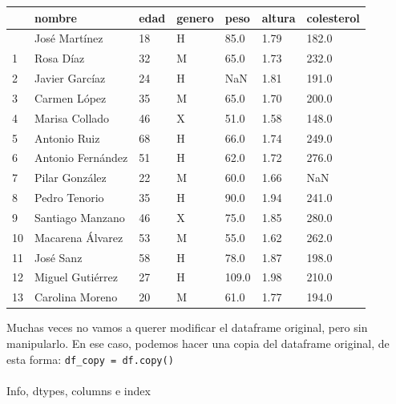 \documentclass[
  letterpaper,
  DIV=11,
  numbers=noendperiod]{scrreprt}
\makeatletter
\let\oldparagraph\paragraph
\renewcommand{\paragraph}{
    \@ifstar
      \xxxParagraphStar
      \xxxParagraphNoStar
  }
\newcommand{\xxxParagraphStar}[1]{\oldparagraph*{#1}\mbox{}}
\newcommand{\xxxParagraphNoStar}[1]{\oldparagraph{#1}\mbox{}}
\makeatother
\begin{document}
\begin{longtable}[]{@{}lllllll@{}}
\toprule\noalign{}
& nombre & edad & genero & peso & altura & colesterol \\
\midrule\noalign{}
\endhead
\bottomrule\noalign{}
\endlastfoot
0 & José Martínez & 18 & H & 85.0 & 1.79 & 182.0 \\
1 & Rosa Díaz & 32 & M & 65.0 & 1.73 & 232.0 \\
2 & Javier Garcíaz & 24 & H & NaN & 1.81 & 191.0 \\
3 & Carmen López & 35 & M & 65.0 & 1.70 & 200.0 \\
4 & Marisa Collado & 46 & X & 51.0 & 1.58 & 148.0 \\
5 & Antonio Ruiz & 68 & H & 66.0 & 1.74 & 249.0 \\
6 & Antonio Fernández & 51 & H & 62.0 & 1.72 & 276.0 \\
7 & Pilar González & 22 & M & 60.0 & 1.66 & NaN \\
8 & Pedro Tenorio & 35 & H & 90.0 & 1.94 & 241.0 \\
9 & Santiago Manzano & 46 & X & 75.0 & 1.85 & 280.0 \\
10 & Macarena Álvarez & 53 & M & 55.0 & 1.62 & 262.0 \\
11 & José Sanz & 58 & H & 78.0 & 1.87 & 198.0 \\
12 & Miguel Gutiérrez & 27 & H & 109.0 & 1.98 & 210.0 \\
13 & Carolina Moreno & 20 & M & 61.0 & 1.77 & 194.0 \\
\end{longtable}

\hfill\break

\begin{tcolorbox}[enhanced jigsaw, arc=.35mm, toptitle=1mm, colframe=quarto-callout-note-color-frame, bottomtitle=1mm, opacitybacktitle=0.6, colbacktitle=quarto-callout-note-color!10!white, leftrule=.75mm, coltitle=black, toprule=.15mm, titlerule=0mm, title=\textcolor{quarto-callout-note-color}{\faInfo}\hspace{0.5em}{Note}, bottomrule=.15mm, rightrule=.15mm, colback=white, breakable, opacityback=0, left=2mm]

Muchas veces no vamos a querer modificar el dataframe original, pero sin
manipularlo. En ese caso, podemos hacer una copia del dataframe
original, de esta forma: \texttt{df\_copy\ =\ df.copy()}

\end{tcolorbox}

\paragraph{Info, dtypes, columns e
index}\label{info-dtypes-columns-e-index}
\end{document}
